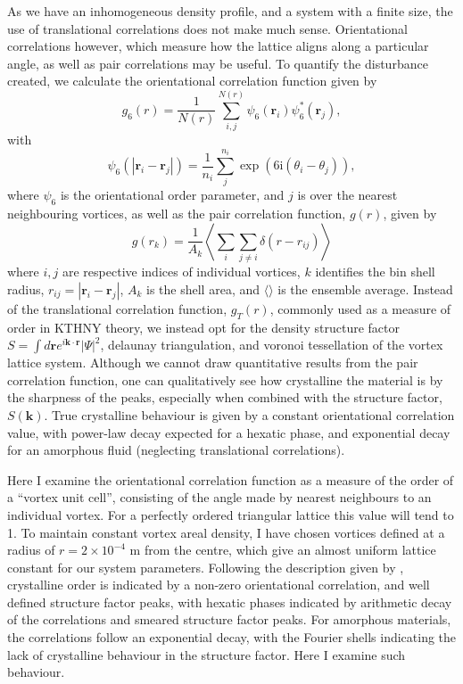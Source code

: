 As we have an inhomogeneous density profile, and a system with a finite size, the use of translational correlations does not make much sense. Orientational correlations however, which measure how the lattice aligns along a particular angle, as well as pair correlations may be useful. To quantify the disturbance created, we calculate the orientational correlation function given by
\begin{equation}\label{eqn:g6r}
	g_6(r) = \frac{1}{N(r)}\displaystyle\sum\limits_{i,j}^{N(r)}\psi_6(\mathbf{r}_i)\psi_6^{*}(\mathbf{r}_j),
\end{equation}
with
\begin{equation}\label{eqn:psi6r}
	\psi_6(|\mathbf{r}_{i} - \mathbf{r}_{j}|) = \frac{1}{n_i}\displaystyle\sum\limits_j^{n_i}\exp(6\mathrm{i}(\theta_i - \theta_j)),
\end{equation}
where $\psi_6$ is the orientational order parameter, and $j$ is over the nearest neighbouring vortices, as well as the pair correlation function, $g(r)$, given by
\begin{equation}\label{eqn:gr}
	g(r_k) = \frac{1}{A_k}\left\langle \displaystyle\sum\limits_{i}\displaystyle\sum\limits_{j\neq i}\delta(r-r_{ij}) \right\rangle
\end{equation}
where $i,j$ are respective indices of individual vortices, $k$ identifies the bin shell radius, $r_{ij}=|\mathbf{r}_i - \mathbf{r}_j|$, $A_k$ is the shell area, and $\langle \rangle$ is the ensemble average. Instead of the translational correlation function, $g_T(r)$, commonly used as a measure of order in KTHNY theory, we instead opt for the density structure factor $S = \int d\mathbf{r}e^{i\mathbf{k}\cdot\mathbf{r}}|\Psi|^2$, delaunay triangulation, and voronoi tessellation of the vortex lattice system. Although we cannot draw quantitative results from the pair correlation function, one can qualitatively see how crystalline the material is by the sharpness of the peaks, especially when combined with the structure factor, $S(\mathbf{k})$. True crystalline behaviour is given by a constant orientational correlation value, with power-law decay expected for a hexatic phase, and exponential decay for an amorphous fluid (neglecting translational correlations).

Here I examine the orientational correlation function as a measure of the order of a ``vortex unit cell'', consisting of the angle made by nearest neighbours to an individual vortex. For a perfectly ordered triangular lattice this value will tend to 1. To maintain constant vortex areal density, I have chosen vortices defined at a radius of $r=2\times 10^{-4}$ m from the centre, which give an almost uniform lattice constant for our system parameters. Following the description given by \cite{Nelson_pma_1982}, crystalline order is indicated by a non-zero orientational correlation, and well defined structure factor peaks, with hexatic phases indicated by arithmetic decay of the correlations and smeared structure factor peaks. For amorphous materials, the correlations follow an exponential decay, with the Fourier shells indicating the lack of crystalline behaviour in the structure factor. Here I examine such behaviour.


